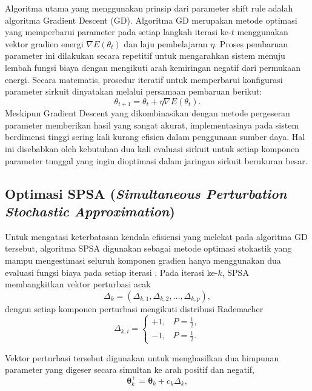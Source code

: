 Algoritma utama yang menggunakan prinsip dari parameter shift rule adalah algoritma Gradient Descent (GD). Algoritma GD merupakan metode optimasi yang memperbarui parameter pada setiap langkah iterasi ke-$t$ menggunakan vektor gradien energi $\nabla E(\theta_t)$ dan laju pembelajaran $\eta$. Proses pembaruan parameter ini dilakukan secara repetitif untuk mengarahkan sistem menuju lembah fungsi biaya dengan mengikuti arah kemiringan negatif dari permukaan energi. Secara matematis, prosedur iteratif untuk memperbarui konfigurasi parameter sirkuit dinyatakan melalui persamaan pembaruan berikut:
\begin{equation}
\theta_{t+1} = \theta_t + \eta \nabla E(\theta_t).
\end{equation}
Meskipun Gradient Descent yang dikombinasikan dengan metode pergeseran parameter memberikan hasil yang sangat akurat, implementasinya pada sistem berdimensi tinggi sering kali kurang efisien dalam penggunaan sumber daya. Hal ini disebabkan oleh kebutuhan dua kali evaluasi sirkuit untuk setiap komponen parameter tunggal yang ingin dioptimasi dalam jaringan sirkuit berukuran besar.

\subsection{Optimasi SPSA (\textit{Simultaneous Perturbation Stochastic Approximation})}
Untuk mengatasi keterbatasan kendala efisiensi yang melekat pada algoritma GD tersebut, algoritma SPSA digunakan sebagai metode optimasi stokastik yang mampu mengestimasi seluruh komponen gradien hanya menggunakan dua evaluasi fungsi biaya pada setiap iterasi \cite{spall_implementation_1998}. Pada iterasi ke-$k$, SPSA membangkitkan vektor perturbasi acak
\begin{equation}
\Delta_k
=
(\Delta_{k,1},\Delta_{k,2},\ldots,\Delta_{k,p}),
\end{equation}
dengan setiap komponen perturbasi mengikuti distribusi Rademacher
\begin{equation}
\Delta_{k,i}
=
\begin{cases}
+1, & P=\frac{1}{2},\\
-1, & P=\frac{1}{2}.
\end{cases}
\end{equation}

Vektor perturbasi tersebut digunakan untuk menghasilkan dua himpunan parameter yang digeser secara simultan ke arah positif dan negatif,
\begin{equation}
\boldsymbol{\theta}_k^{+}
=
\boldsymbol{\theta}_k
+
c_k \Delta_k,
\end{equation}

